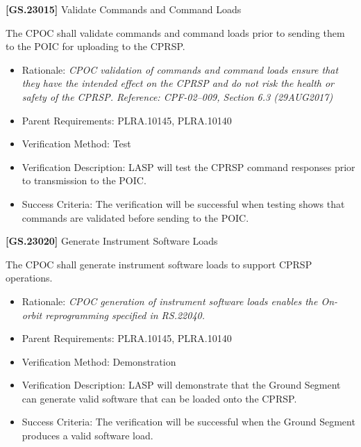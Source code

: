 \documentclass[12pt,oneside,oldfontcommands]{memoir}
\begin{document}
\textbf{[GS.23015]} Validate Commands and Command Loads

The \gls{CPOC} shall validate commands and command loads prior to sending them to the \gls{POIC} for uploading to the \gls{CPRSP}.

\begin{itemize}
\item{} Rationale: \emph{CPOC validation of commands and command loads ensure that they have the intended effect on the CPRSP and do not risk the health or safety of the CPRSP. Reference: CPF-02--009, Section 6.3 (29AUG2017)}

\item{} Parent Requirements: PLRA.10145, PLRA.10140

\item{} Verification Method: Test

\item{} Verification Description: \gls{LASP} will \gls{test} the \gls{CPRSP} command responses prior to transmission to the \gls{POIC}.

\item{} Success Criteria: The verification will be successful when \gls{test}ing shows that commands are validated before sending to the \gls{POIC}.

\end{itemize}

\textbf{[GS.23020]} Generate Instrument Software Loads

The \gls{CPOC} shall generate instrument software loads to support \gls{CPRSP} operations.

\begin{itemize}
\item{} Rationale: \emph{CPOC generation of instrument software loads enables the On-orbit reprogramming specified in RS.22040.}

\item{} Parent Requirements: PLRA.10145, PLRA.10140

\item{} Verification Method: Demonstration

\item{} Verification Description: \gls{LASP} will demonstrate that the Ground Segment can generate valid software that can be loaded onto the \gls{CPRSP}.

\item{} Success Criteria: The verification will be successful when the Ground Segment produces a valid software load.

\end{itemize}
\end{document}
